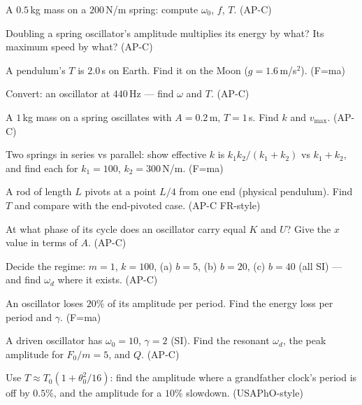 \begin{exercise}[easy]
A $0.5$\,kg mass on a $200$\,N/m spring: compute $\omega_0$, $f$, $T$.
(AP-C)
\end{exercise}
\begin{exercise}[easy]
Doubling a spring oscillator's amplitude multiplies its energy by what?
Its maximum speed by what? (AP-C)
\end{exercise}
\begin{exercise}[easy]
A pendulum's $T$ is $2.0$\,s on Earth. Find it on the Moon
($g=1.6$\,m/s$^{2}$). (F=ma)
\end{exercise}
\begin{exercise}[easy]
Convert: an oscillator at $440$\,Hz --- find $\omega$ and $T$. (AP-C)
\end{exercise}
\begin{exercise}[easy]
A $1$\,kg mass on a spring oscillates with $A=0.2$\,m, $T=1$\,s. Find
$k$ and $v_{\max}$. (AP-C)
\end{exercise}
\begin{exercise}[medium]
Two springs in series vs parallel: show effective $k$ is
$k_1k_2/(k_1+k_2)$ vs $k_1+k_2$, and find each for $k_1=100$,
$k_2=300$\,N/m. (F=ma)
\end{exercise}
\begin{exercise}[medium]
A rod of length $L$ pivots at a point $L/4$ from one end (physical
pendulum). Find $T$ and compare with the end-pivoted case. (AP-C FR-style)
\end{exercise}
\begin{exercise}[medium]
At what phase of its cycle does an oscillator carry equal $K$ and $U$?
Give the $x$ value in terms of $A$. (AP-C)
\end{exercise}
\begin{exercise}[medium]
Decide the regime: $m=1$, $k=100$, (a) $b=5$, (b) $b=20$, (c) $b=40$
(all SI) --- and find $\omega_d$ where it exists. (AP-C)
\end{exercise}
\begin{exercise}[medium]
An oscillator loses $20\%$ of its amplitude per period. Find the energy
loss per period and $\gamma$. (F=ma)
\end{exercise}
\begin{exercise}[medium]
A driven oscillator has $\omega_0=10$, $\gamma=2$ (SI). Find the
resonant $\omega_d$, the peak amplitude for $F_0/m=5$, and $Q$. (AP-C)
\end{exercise}
\begin{exercise}[hard]
Use $T\approx T_0(1+\theta_0^{2}/16)$: find the amplitude where a
grandfather clock's period is off by $0.5\%$, and the amplitude for a
$10\%$ slowdown. (USAPhO-style)
\end{exercise}
